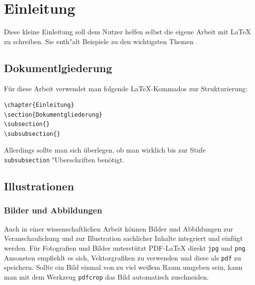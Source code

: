 \chapter{Einleitung}

Diese kleine Einleitung soll dem Nutzer helfen selbst die eigene Arbeit mit \LaTeX{} zu schreiben. Sie enth"alt Beispiele zu den wichtigsten Themen .

\blindtext

\section{Dokumentlgiederung}

Für diese Arbeit verwendet man folgende LaTeX-Kommados zur Strukturierung:

\begin{verbatim}
\chapter{Einleitung}
\section{Dokumentgliederung}
\subsection{}
\subsubsection{}
\end{verbatim}

Allerdings sollte man sich überlegen, ob man wirklich bis zur Stufe \verb|subsubsection| "Uberschriften benötigt.

\section{Illustrationen}

\blindtext

\blindtext

\subsection{Bilder und Abbildungen}

Auch in einer wissenschaftlichen Arbeit können Bilder und Abbildungen zur Veranschaulichung und zur Illustration sachlicher Inhalte integriert und einfügt werden. Für Fotografien und Bilder unterstützt PDF-\LaTeX{} direkt \verb|jpg| und \verb|png|. Ansonsten empfiehlt es sich, Vektorgrafiken zu verwenden und diese als \verb|pdf| zu speichern. Sollte ein Bild einmal von zu viel weißem Raum umgeben sein, kann man mit dem Werkzeug \verb|pdfcrop| das Bild automatisch zuschneiden.

